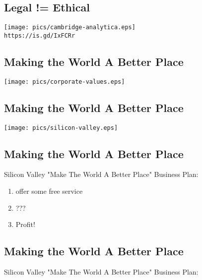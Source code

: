 \documentclass[xga]{xdvislides}
\begin{document}
\subsection{Legal != Ethical}
\vspace*{\fill}
\begin{center}
	\texttt{[image: pics/cambridge-analytica.eps]} \\

	\small
	{\tt https://is.gd/IxFCRr}
	\Normalsize
\end{center}
\vspace*{\fill}



\subsection{Making the World A Better Place}
\vspace*{\fill}
\begin{center}
	\texttt{[image: pics/corporate-values.eps]}
\end{center}
\vspace*{\fill}

\subsection{Making the World A Better Place}
\vspace*{\fill}
\begin{center}
	\texttt{[image: pics/silicon-valley.eps]}
\end{center}
\vspace*{\fill}

\subsection{Making the World A Better Place}
Silicon Valley "Make The World A Better Place"
Business Plan:

\vspace*{\fill}
\begin{enumerate}
	\item offer some free service
	\item ???
	\item Profit!
\end{enumerate}
\vspace*{\fill}

\subsection{Making the World A Better Place}
Silicon Valley "Make The World A Better Place"
Business Plan:
\end{document}
